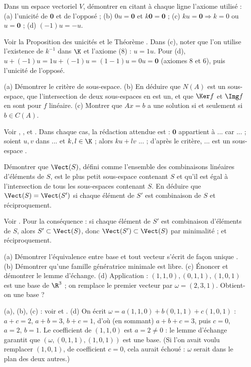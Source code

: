 \begin{exo}
Dans un espace vectoriel $V$, démontrer en citant à chaque ligne l'axiome utilisé : (a) l'unicité de $\mathbf 0$ et de l'opposé ; (b) $0u=\mathbf 0$ et $k\mathbf 0=\mathbf 0$ ; (c) $ku=\mathbf 0\Rightarrow k=0$ ou $u=\mathbf 0$ ; (d) $(-1)u=-u$.
\begin{corrige}
Voir la Proposition des unicités et le Théorème . Dans (c), noter que l'on utilise l'existence de $k^{-1}$ dans $\K$ et l'axiome (8) : $u=1u$. Pour (d), $u+(-1)u=1u+(-1)u=(1-1)u=0u=\mathbf 0$ (axiomes 8 et 6), puis l'unicité de l'opposé.
\end{corrige}
\end{exo}
\begin{exo}
(a) Démontrer le critère de sous-espace. (b) En déduire que $N(A)$ est un sous-espace, que l'intersection de deux sous-espaces en est un, et que $\Ker f$ et $\Img f$ en sont pour $f$ linéaire. (c) Montrer que $Ax=b$ a une solution si et seulement si $b\in C(A)$.
\begin{corrige}
Voir , ,  et . Dans chaque cas, la rédaction attendue est : \og $\mathbf 0$ appartient à ... car ... ; soient $u,v$ dans ... et $k,l\in\K$ ; alors $ku+lv$ ... ; d'après le critère, ... est un sous-espace \fg.
\end{corrige}
\end{exo}
\begin{exo}
Démontrer que $\Vect(S)$, défini comme l'ensemble des combinaisons linéaires d'éléments de $S$, est le plus petit sous-espace contenant $S$ et qu'il est égal à l'intersection de tous les sous-espaces contenant $S$. En déduire que $\Vect(S)=\Vect(S')$ si chaque élément de $S'$ est combinaison de $S$ et réciproquement.
\begin{corrige}
Voir . Pour la conséquence : si chaque élément de $S'$ est combinaison d'éléments de $S$, alors $S'\subset\Vect(S)$, donc $\Vect(S')\subset\Vect(S)$ par minimalité ; et réciproquement.
\end{corrige}
\end{exo}
\begin{exo}
(a) Démontrer l'équivalence entre \og base \fg{} et \og tout vecteur s'écrit de façon unique \fg. (b) Démontrer qu'une famille génératrice minimale est libre. (c) Énoncer et démontrer le lemme d'échange. (d) Application : $(1,1,0),(0,1,1),(1,0,1)$ est une base de $\R^3$ ; on remplace le premier vecteur par $\omega=(2,3,1)$. Obtient-on une base ?
\begin{corrige}
(a), (b), (c) : voir  et . (d) On écrit $\omega=a(1,1,0)+b(0,1,1)+c(1,0,1)$ : $a+c=2$, $a+b=3$, $b+c=1$, d'où (en sommant) $a+b+c=3$, puis $c=0$, $a=2$, $b=1$. Le coefficient de $(1,1,0)$ est $a=2\neq0$ : le lemme d'échange garantit que $(\omega,(0,1,1),(1,0,1))$ est une base. (Si l'on avait voulu remplacer $(1,0,1)$, de coefficient $c=0$, cela aurait échoué : $\omega$ serait dans le plan des deux autres.)
\end{corrige}
\end{exo}
